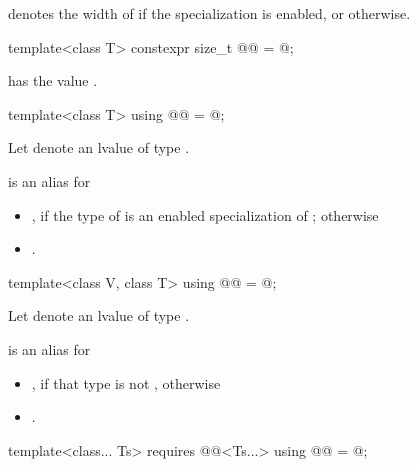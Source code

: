 \begin{itemdescr}
\pnum
{} denotes the width of  if the specialization  is enabled, or 
otherwise.
\end{itemdescr}

\begin{itemdecl}
template<class T> constexpr size_t @@ = @\seebelow@;
\end{itemdecl}

\begin{itemdescr}
\pnum
{} has the value
.
\end{itemdescr}

\begin{itemdecl}
template<class T> using @@ = @\seebelow@;
\end{itemdecl}

\begin{itemdescr}
\pnum
Let  denote an lvalue of type .

\pnum
{} is an alias for
\begin{itemize}
 \item
   , if the type of  is an enabled
   specialization of ; otherwise
 \item
   .
\end{itemize}
\end{itemdescr}

\begin{itemdecl}
template<class V, class T> using @@ = @\seebelow@;
\end{itemdecl}

\begin{itemdescr}
\pnum
Let  denote an lvalue of type .

\pnum
{} is an alias for
\begin{itemize}
 \item
   , if that type is not ,
   otherwise
 \item
   .
\end{itemize}
\end{itemdescr}

\begin{itemdecl}
template<class... Ts>
  requires @@<Ts...>
    using @@ = @\seebelow@;
\end{itemdecl}

